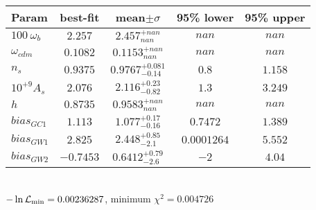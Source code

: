 \begin{tabular}{|l|c|c|c|c|} 
 \hline 
Param & best-fit & mean$\pm\sigma$ & 95\% lower & 95\% upper \\ \hline 
$100~\omega_{b }$ &$2.257$ & $2.457_{nan}^{+nan}$ & $nan$ & $nan$ \\ 
$\omega_{cdm }$ &$0.1082$ & $0.1153_{nan}^{+nan}$ & $nan$ & $nan$ \\ 
$n_{s }$ &$0.9375$ & $0.9767_{-0.14}^{+0.081}$ & $0.8$ & $1.158$ \\ 
$10^{+9}A_{s }$ &$2.076$ & $2.116_{-0.82}^{+0.23}$ & $1.3$ & $3.249$ \\ 
$h$ &$0.8735$ & $0.9583_{nan}^{+nan}$ & $nan$ & $nan$ \\ 
$bias_{GC 1 }$ &$1.113$ & $1.077_{-0.16}^{+0.17}$ & $0.7472$ & $1.389$ \\ 
$bias_{GW 1 }$ &$2.825$ & $2.448_{-2.1}^{+0.85}$ & $0.0001264$ & $5.552$ \\ 
$bias_{GW 2 }$ &$-0.7453$ & $0.6412_{-2.6}^{+0.79}$ & $-2$ & $4.04$ \\ 
\hline 
 \end{tabular} \\ 
$-\ln{\cal L}_\mathrm{min} =0.00236287$, minimum $\chi^2=0.004726$ \\ 
